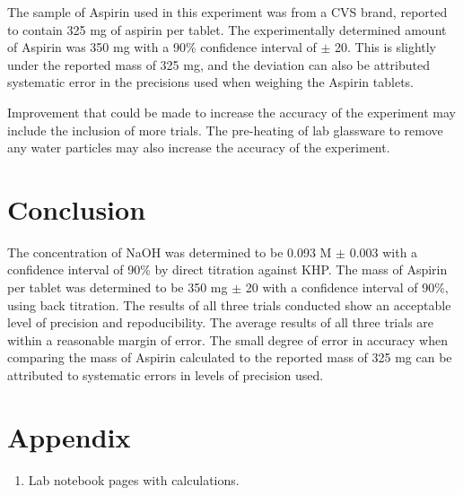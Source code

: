 \documentclass{article}
\begin{document}
The sample of Aspirin used in this experiment was from a CVS brand, reported to contain 325 mg of
aspirin per tablet. The experimentally determined amount of Aspirin was 350 mg with a 90\%
confidence interval of $\pm$ 20.
This is slightly under the reported mass of 325 mg, and the deviation can also be attributed
systematic error in the precisions used when weighing the Aspirin tablets.

Improvement that could be made to increase the accuracy of the experiment may include the inclusion
of more trials. The pre-heating of lab glassware to remove any water particles may also increase
the accuracy of the experiment.

\section {Conclusion}

The concentration of NaOH was determined to be 0.093 M $\pm$ 0.003 with a confidence interval of
90\% by direct titration against KHP. The mass of Aspirin per tablet was determined to be 350 mg
$\pm$ 20 with a confidence interval of 90\%, using back titration. The results of all three trials
conducted show an acceptable level of precision and repoducibility. The average results of all three
trials are within a reasonable margin of error. The small degree of error in accuracy when comparing
the mass of Aspirin calculated to the reported mass of 325 mg can be attributed to systematic errors
in levels of precision used.


\newpage


\newpage

\section {Appendix}

\begin{enumerate}
        \item Lab notebook pages with calculations.
\end{enumerate}
\end{document}
